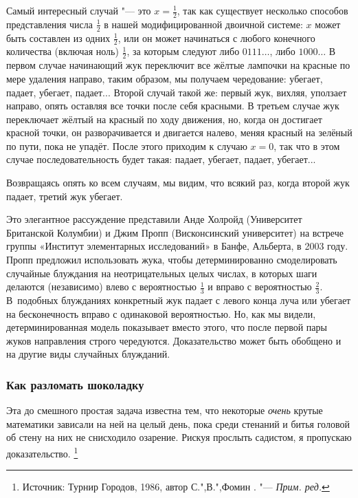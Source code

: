 \documentclass[twoside]{book}
\begin{document}
Самый интересный случай "--- это $x=\tfrac12$, так как существует несколько способов представления числа $\tfrac12$ в нашей модифицированной двоичной системе: $x$ может быть составлен из одних $\tfrac12$, или он может начинаться с любого конечного количества (включая ноль) $\tfrac12$, за которым следуют либо $0111\dots$, либо $1000\dots$
В первом случае начинающий жук переключит все жёлтые лампочки на красные по мере удаления направо, таким образом, мы получаем чередование: убегает, падает, убегает, падает...
Второй случай такой же: первый жук, вихляя, уползает направо, опять оставляя все точки после себя красными.
В третьем случае жук переключает жёлтый на красный по ходу движения, но, когда он достигает красной точки, он разворачивается и двигается налево, меняя красный на зелёный по пути, пока не упадёт.
После этого приходим к случаю $x = 0$, так что в этом случае  последовательность будет такая: падает, убегает, падает, убегает...

Возвращаясь опять ко всем случаям, мы видим, что всякий раз, когда второй жук падает, третий жук убегает.
\heart

Это элегантное рассуждение представили
Анде Холройд (Университет Британской Колумбии) и Джим Пропп (Висконсинский университет) на встрече группы «Институт элементарных исследований» в Банфе, Альберта, в 2003 году. %
Пропп предложил использовать жука, чтобы детерминированно смоделировать случайные блуждания на неотрицательных целых числах, в которых шаги делаются (независимо) влево с вероятностью $\tfrac13$ и вправо с вероятностью $\tfrac23$.
В~подобных блужданиях конкретный жук падает с левого конца луча или убегает на бесконечность вправо с одинаковой вероятностью.
Но, как мы видели, детерминированная модель показывает вместо этого, что после первой пары жуков направления строго чередуются.
Доказательство может быть обобщено и на другие виды случайных блужданий.

\subsubsection*{Как разломать шоколадку}%

Эта до смешного простая задача известна тем, что некоторые \emph{очень} крутые математики зависали на ней на целый день, пока среди  стенаний и битья головой об стену на них не снисходило озарение.
Рискуя прослыть садистом, я пропускаю доказательство.%
\footnote{Источник: Турнир Городов, 1986, автор  С.",В.",Фомин \cite[№97909]{problems}. "--- \emph{Прим. ред.}}
\end{document}
